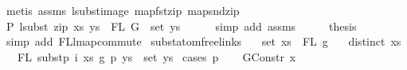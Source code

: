 \begin{isabellebody}
\ {\isacharparenleft}{\kern0pt}metis\ assms{\isacharparenleft}{\kern0pt}{}{\isacharcomma}{\kern0pt}{}{\isacharparenright}{\kern0pt}\ lsubst{\isacharunderscore}{\kern0pt}image\ map{\isacharunderscore}{\kern0pt}fst{\isacharunderscore}{\kern0pt}zip\ map{\isacharunderscore}{\kern0pt}snd{\isacharunderscore}{\kern0pt}zip{\isacharparenright}{\kern0pt}\isanewline
\ \ \isamarkupfalse%
\ \isamarkupfalse%
\ P{}{\isacharcolon}{\kern0pt}\ {\isachardoublequoteopen}lsubst\ {\isacharparenleft}{\kern0pt}zip\ xs\ ys{\isacharparenright}{\kern0pt}\ {\isacharbackquote}{\kern0pt}\ FL\ G\ {\isacharequal}{\kern0pt}\ set\ ys{\isachardoublequoteclose}\isanewline
\ \ \ \ \isamarkupfalse%
\ {\isacharparenleft}{\kern0pt}simp\ add{\isacharcolon}{\kern0pt}\ assms{\isacharparenleft}{\kern0pt}{}{\isacharparenright}{\kern0pt}{\isacharparenright}{\kern0pt}\isanewline
\ \ \isamarkupfalse%
\ \isamarkupfalse%
\ {\isacharquery}{\kern0pt}thesis\isanewline
\ \ \ \ \isamarkupfalse%
\ {\isacharparenleft}{\kern0pt}simp\ add{\isacharcolon}{\kern0pt}\ FL{\isacharunderscore}{\kern0pt}lmap{\isacharunderscore}{\kern0pt}commute{\isacharparenright}{\kern0pt}\isanewline
{}\isamarkupfalse%
%
\endisatagproof
{\isafoldproof}%
%
\isadelimproof
%
\endisadelimproof
%
\isadelimdocument
%
\endisadelimdocument
%
\isatagdocument
%
\isamarkuptrue%
%
\endisatagdocument
{\isafolddocument}%
%
\isadelimdocument
%
\endisadelimdocument
{}\isamarkupfalse%
\ subst{\isacharunderscore}{\kern0pt}atom{\isacharunderscore}{\kern0pt}freelinks{\isacharcolon}{\kern0pt}\isanewline
\ \ \ {\isachardoublequoteopen}set\ xs\ {\isacharequal}{\kern0pt}\ FL\ g{}{\isachardoublequoteclose}\isanewline
\ \ \ {\isachardoublequoteopen}distinct\ xs{\isachardoublequoteclose}\isanewline
\ \ \ {\isachardoublequoteopen}FL\ {\isacharparenleft}{\kern0pt}subst{\isacharunderscore}{\kern0pt}p\ i\ xs\ g{}\ p\ ys{\isacharparenright}{\kern0pt}\ {\isacharequal}{\kern0pt}\ set\ ys{\isachardoublequoteclose}\isanewline
%
\isadelimproof
%
\endisadelimproof
%
\isatagproof
{}\isamarkupfalse%
\ {\isacharparenleft}{\kern0pt}cases\ p{\isacharparenright}{\kern0pt}\isanewline
\ \ \isamarkupfalse%
\ {\isacharparenleft}{\kern0pt}GConstr\ x{}{\isacharparenright}{\kern0pt}\isanewline

\end{isabellebody}

